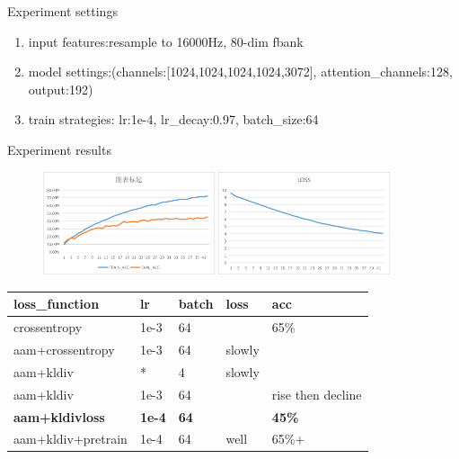 \documentclass{beamer}
\begin{document}
\begin{frame}{Experiment settings}
  \begin{enumerate}
    \item input features:resample to 16000Hz, 80-dim fbank
    \item model settings:(channels:[1024,1024,1024,1024,3072], attention\_channels:128, output:192)
    \item train strategies: lr:1e-4, lr\_decay:0.97, batch\_size:64
  \end{enumerate}
\end{frame}

\begin{frame}{Experiment results}
  \begin{figure}
    \centering
  \includegraphics[width=0.45\textwidth]{image/3-1.png}
  \includegraphics[width=0.45\textwidth]{image/3-2.png}
  \end{figure}
  \begin{table}[]
    \begin{tabular}{|l|l|l|l|l|}
    \hline
    loss\_function                & lr            & batch & loss            & acc                       \\ \hline
    crossentropy                  & 1e-3          & 64          &                 & 65\%                      \\ \hline
    aam+crossentropy       & 1e-3          & 64          &slowly &                           \\ \hline
    aam+kldiv          & *             & 4           &slowly &                           \\ \hline
    aam+kldiv         & 1e-3          & 64          &                 & rise then decline \\ \hline
    \textbf{aam+kldivloss} & \textbf{1e-4} & \textbf{64} & \textbf{}       & \textbf{45\%}             \\ \hline
    aam+kldiv+pretrain & 1e-4          & 64          &well    & 65\%+                     \\ \hline
    \end{tabular}
    \end{table}
\end{frame}
\end{document}
